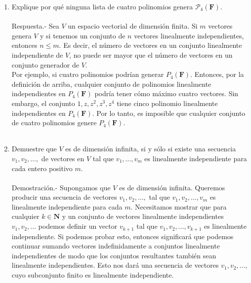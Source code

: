 \begin{enumerate}[\bfseries 1.]
    \item Explique por qué ninguna lista de cuatro polinomios genera $\mathcal{P}_4 (\textbf{F})$.\\\\
	Respuesta.-\; Sea $V$ un espacio vectorial de dimensión finita. Si $m$ vectores genera $V$ y si tenemos un conjunto de $n$ vectores linealmente independientes, entonces $n\leq m$. Es decir, el número de vectores en un conjunto linealmente independiente de $V$, no puede ser mayor que el número de vectores en un conjunto generador de $V$.\\
	Por ejemplo, si cuatro polinomios podrían generar $P_4(\textbf{F})$. Entonces, por la definición de arriba, cualquier conjunto de polinomios linealmente independientes en $P_4(\textbf{F})$ podría tener cómo máximo cuatro vectores. Sin embargo, el conjunto $1,z,z^2,z^3,z^4$ tiene cinco polinomio linealmente independientes en $P_4(\textbf{F})$. Por lo tanto, es imposible que cualquier conjunto de cuatro polinomios genere $P_4(\textbf{F})$.\\\\

    \item Demuestre que $V$ es de dimensión infinita, si y sólo si existe una secuencia $v_1,v_2,\ldots,$ de vectores en $V$ tal que $v_1,\ldots,v_m$ es linealmente independiente para cada entero positivo $m$.\\\\
	Demostración.-\; Supongamos que $V$ es de dimensión infinita. Queremos producir una secuencia de vectores $v_1,v_2,\ldots,$ tal que $v_1,v_2,\ldots,v_m$ es linealmente independiente para cada $m$. Necesitamos mostrar que para cualquier $k\in \textbf{N}$ y un conjunto de vectores linealmente independientes $v_1,v_2,\ldots$ podemos definir un vector $v_{k+1}$ tal que $v_1,v_2,\ldots,v_{k+1}$ es linealmente independiente. Si podemos probar esto, entonces significará que podemos continuar sumando vectores indefinidamente a conjuntos linealmente independientes de modo que los conjuntos resultantes también sean linealmente independientes. Esto nos dará una secuencia de vectores $v_1,v_2,\ldots$, cuyo subconjunto finito es linealmente independiente.\\


\end{enumerate}

